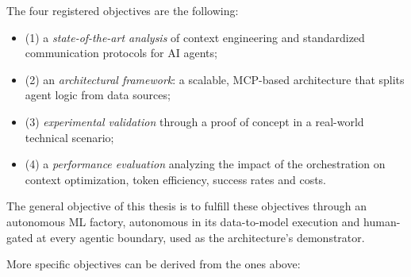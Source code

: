 The four registered objectives are the following:

\begin{itemize}
	\item (1) a \emph{state-of-the-art analysis} of context engineering and standardized communication protocols for AI agents;
	\item (2) an \emph{architectural framework}: a scalable, MCP-based architecture that splits agent logic from data sources;
	\item (3) \emph{experimental validation} through a proof of concept in a real-world technical scenario;
	\item (4) a \emph{performance evaluation} analyzing the impact of the orchestration on context optimization, token efficiency, success rates and costs.
\end{itemize}

The general objective of this thesis is to fulfill these objectives through an autonomous ML factory, autonomous in its data-to-model execution and human-gated at every agentic boundary, used as the architecture's demonstrator.

More specific objectives can be derived from the ones above:

